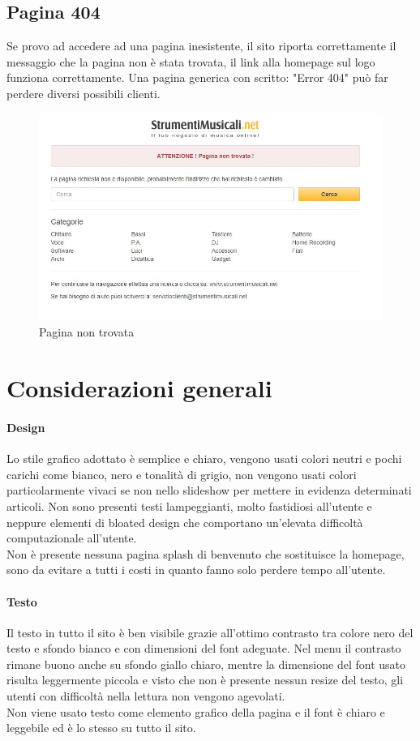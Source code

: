 \documentclass[12pt]{article}
\begin{document}
	\subsection{Pagina 404}
	\vspace{0.5cm}
	Se provo ad accedere ad una pagina inesistente, il sito riporta correttamente il messaggio che la pagina non è stata trovata, il link alla homepage sul logo funziona correttamente. Una  pagina generica con scritto: "Error 404" può far perdere diversi possibili clienti.
	\begin{figure}[ht!]
		\centering	
		\includegraphics[width=180mm]{images/404.jpg}
		\caption{Pagina non trovata}
	\end{figure}
	\newpage
	\section{Considerazioni generali}
	\vspace{0.5cm}
	\paragraph{Design} Lo stile grafico adottato è semplice e chiaro, vengono usati colori neutri e pochi carichi come bianco, nero e tonalità di grigio, non vengono usati colori particolarmente vivaci se non nello slideshow per mettere in evidenza determinati articoli. Non sono presenti testi lampeggianti, molto fastidiosi all'utente e neppure elementi di bloated design che comportano un'elevata difficoltà computazionale all'utente. \\
	Non è presente nessuna pagina splash di benvenuto che sostituisce la homepage, sono da evitare a tutti i costi in quanto fanno solo perdere tempo all'utente. 
	\\
	\paragraph{Testo} Il testo in tutto il sito è ben visibile grazie all'ottimo contrasto tra colore nero del testo e sfondo bianco e con dimensioni del font adeguate. Nel menu il contrasto rimane buono anche su sfondo giallo chiaro, mentre la dimensione del font usato risulta leggermente piccola e visto che non è presente nessun resize del testo,  gli utenti con difficoltà nella lettura non vengono agevolati. 
	\\Non viene usato testo come elemento grafico della pagina e il font è chiaro e leggebile ed è lo stesso su tutto il sito.
	\\
\end{document}
